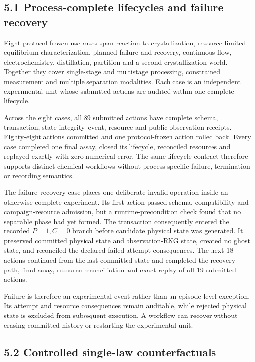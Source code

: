 \documentclass[10pt,twocolumn]{article}
\begin{document}
\subsection{5.1 Process-complete lifecycles and failure
recovery}\label{process-complete-lifecycles-and-failure-recovery}

Eight protocol-frozen use cases span reaction-to-crystallization,
resource-limited equilibrium characterization, planned failure and
recovery, continuous flow, electrochemistry, distillation, partition and
a second crystallization world. Together they cover single-stage and
multistage processing, constrained measurement and multiple separation
modalities. Each case is an independent experimental unit whose
submitted actions are audited within one complete lifecycle.

Across the eight cases, all 89 submitted actions have complete schema,
transaction, state-integrity, event, resource and public-observation
receipts. Eighty-eight actions committed and one protocol-frozen action
rolled back. Every case completed one final assay, closed its lifecycle,
reconciled resources and replayed exactly with zero numerical error. The
same lifecycle contract therefore supports distinct chemical workflows
without process-specific failure, termination or recording semantics.

The failure--recovery case places one deliberate invalid operation
inside an otherwise complete experiment. Its first action passed schema,
compatibility and campaign-resource admission, but a
runtime-precondition check found that no separable phase had yet formed.
The transaction consequently entered the recorded \(P=1,C=0\) branch
before candidate physical state was generated. It preserved committed
physical state and observation-RNG state, created no ghost state, and
reconciled the declared failed-attempt consequences. The next 18 actions
continued from the last committed state and completed the recovery path,
final assay, resource reconciliation and exact replay of all 19
submitted actions.

Failure is therefore an experimental event rather than an episode-level
exception. Its attempt and resource consequences remain auditable, while
rejected physical state is excluded from subsequent execution. A
workflow can recover without erasing committed history or restarting the
experimental unit.

\subsection{5.2 Controlled single-law
counterfactuals}\label{controlled-single-law-counterfactuals}
\end{document}
